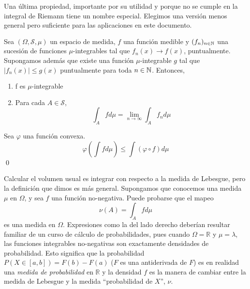 \documentclass[main.tex]{subfiles}
\begin{document}
Una última propiedad, importante por su utilidad y porque no se cumple en la integral de Riemann tiene un nombre especial. Elegimos una versión menos general pero suficiente para las aplicaciones en este documento.

\begin{theorem}
	Sea $(\Omega, \mathcal{S}, \mu)$ un espacio de medida, $f$ una función medible y $(f_n)_{n\in\operatorname{\mathbb{N}}}$ una sucesión de funciones $\mu$-integrables tal que $f_n(x) \rightarrow f(x)$, puntualmente. Supongamos además que existe una función $\mu$-integrable $g$ tal que $\mid f_n(x)\mid \leq g(x)$ puntualmente para toda $n\in\operatorname{\mathbb{N}}$. Entonces,
	\begin{enumerate}[label=\roman*.]
		\item f es $\mu$-integrable
		\item Para cada $A\in\mathcal{S}$,
		\begin{equation*}
			\int_A f d\mu = \lim_{n\rightarrow\infty}\int_A f_n d\mu 
		\end{equation*}
	\end{enumerate}
\end{theorem}

\begin{prop}\label{thm:jensen}
Sea $\varphi$ una función convexa.
\begin{equation*}
			\varphi\left(\int fd\mu \right) \leq \int\left(\varphi\circ f\right)d\mu
\end{equation*}
\qed
\end{prop}


Calcular el volumen usual es integrar con respecto a la medida de Lebesgue, pero la definición que dimos es más general. Supongamos que conocemos una medida $\mu$ en $\Omega$, y sea $f$ una función no-negativa. Puede probarse que el mapeo
\begin{equation*}
	\nu(A)=\int_Afd\mu 
\end{equation*} 
es una medida en $\Omega$. Expresiones como la del lado derecho deberían resultar familiar de un curso de cálculo de probabilidades, pues cuando $\Omega=\mathbb{R}$ y $\mu=\lambda$, las funciones integrables no-negativas son exactamente densidades de probabilidad. Esto significa que la probabilidad $P(X\in [a,b])=F(b)-F(a)$ ($F$ es una antiderivada de $F$) es en realidad una \textit{medida de probabilidad} en $\mathbb{R}$ y la densidad $f$ es la manera de cambiar entre la medida de Lebesgue y la medida \enquote{probabilidad de $X$}, $\nu$. 
\end{document}
